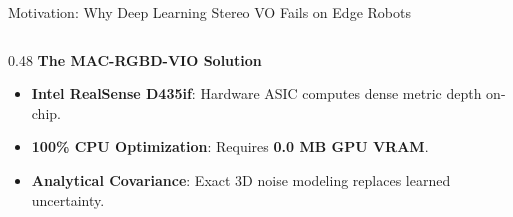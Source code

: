 \documentclass[aspectratio=169, 10pt]{beamer}
\begin{document}
\begin{frame}{Motivation: Why Deep Learning Stereo VO Fails on Edge Robots}
\begin{columns}[T]
\begin{column}{0.48\textwidth}
      {\normalsize \textbf{\textcolor{EmeraldGreen}{The MAC-RGBD-VIO Solution}}}
      \begin{itemize}
        \setlength{\itemsep}{3pt}
        \item \textbf{Intel RealSense D435if}: Hardware ASIC computes dense metric depth on-chip.
        \item \textbf{100\% CPU Optimization}: Requires \textbf{0.0 MB GPU VRAM}.
        \item \textbf{Analytical Covariance}: Exact 3D noise modeling replaces learned uncertainty.
      \end{itemize}
    \end{column}
  \end{columns}
\end{frame}

\end{document}
